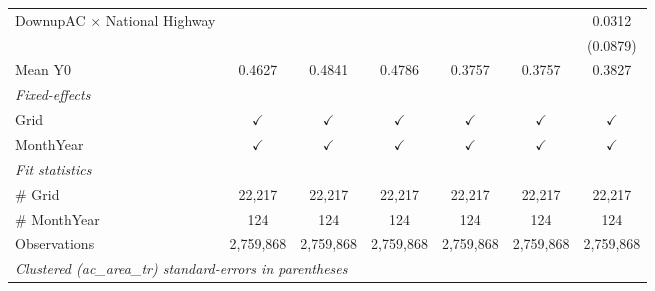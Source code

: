 \begin{table}[htbp]
\begin{tabular}{lcccccc}
      DownupAC $\times$ National Highway                         &               &               &               &               &               & 0.0312\\   
                                                                 &               &               &               &               &               & (0.0879)\\   
      \hline Mean Y0                                             & 0.4627        & 0.4841        & 0.4786        & 0.3757        & 0.3757        & 0.3827\\  
      \midrule
      \emph{Fixed-effects}\\
      Grid                                                       & $\checkmark$  & $\checkmark$  & $\checkmark$  & $\checkmark$  & $\checkmark$  & $\checkmark$\\   
      MonthYear                                                  & $\checkmark$  & $\checkmark$  & $\checkmark$  & $\checkmark$  & $\checkmark$  & $\checkmark$\\   
      \midrule
      \emph{Fit statistics}\\
      \# Grid                                                    & 22,217        & 22,217        & 22,217        & 22,217        & 22,217        & 22,217\\  
      \# MonthYear                                               & 124           & 124           & 124           & 124           & 124           & 124\\  
      Observations                                               & 2,759,868     & 2,759,868     & 2,759,868     & 2,759,868     & 2,759,868     & 2,759,868\\  
      \midrule \midrule
      \multicolumn{7}{l}{\emph{Clustered (ac\_area\_tr) standard-errors in parentheses}}\\
   \end{tabular}
\end{table}


